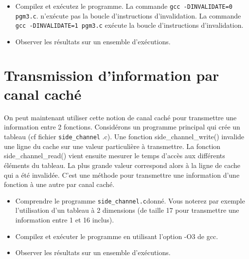 \documentclass{article}
\begin{document}
\begin{itemize}
\item Compilez et exécutez le programme. La commande \texttt{gcc
  -DINVALIDATE=0 pgm3.c}. n’exécute pas la boucle d’instructions
  d’invalidation. La commande \texttt{gcc -DINVALIDATE=1 pgm3.c} exécute la
  boucle d’instructions d’invalidation.

\item Observer les résultats sur un ensemble d’exécutions.

\end{itemize}

\section{Transmission d'information par canal caché}

On peut maintenant utiliser cette notion de canal caché pour
transmettre une information entre 2 fonctions. Considérons un
programme principal qui crée un tableau (cf fichier \texttt{side\_channel}
.c). Une fonction side\_channel\_write() invalide une ligne du cache sur
une valeur particulière à transmettre. La fonction side\_channel\_read()
vient ensuite mesurer le temps d’accès aux différents éléments du
tableau. La plus grande valeur correspond alors à la ligne de cache
qui a été invalidée. C’est une méthode pour transmettre une
information d’une fonction à une autre par canal caché.

\begin{itemize}
\item Comprendre le programme \texttt{side\_channel.c}donné. Vous
  noterez par exemple l’utilisation d’un tableau à 2 dimensions (de
  taille 17 pour transmettre une information entre 1 et 16 inclus).
\item Compilez et exécuter le programme en utilisant l’option -O3 de
  gcc.
\item Observer les résultats sur un ensemble d’exécutions.
\end{itemize}
\end{document}

